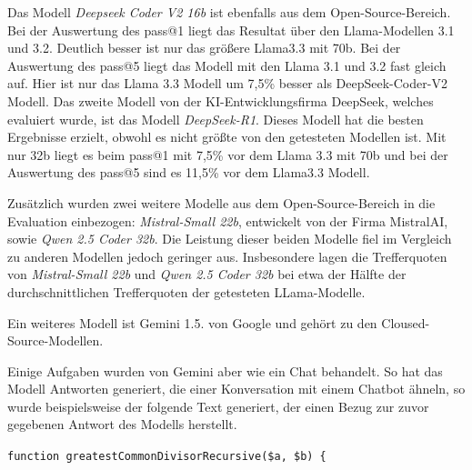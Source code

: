 Das Modell \textit{Deepseek Coder V2 16b} ist ebenfalls aus dem Open-Source-Bereich. Bei der Auswertung des pass@1 liegt das Resultat über den Llama-Modellen 3.1 und 3.2. Deutlich besser ist nur das größere Llama3.3 mit 70b. Bei der Auswertung des pass@5 liegt das Modell mit den Llama 3.1 und 3.2 fast gleich auf. Hier ist nur das Llama 3.3 Modell um 7,5\% besser als DeepSeek-Coder-V2 Modell. Das zweite Modell von der KI-Entwicklungsfirma DeepSeek, welches evaluiert wurde, ist das Modell \textit{DeepSeek-R1}. Dieses Modell hat die besten Ergebnisse erzielt, obwohl es nicht größte von den getesteten Modellen ist. Mit nur 32b liegt es beim pass@1 mit 7,5\% vor dem Llama 3.3 mit 70b und bei der Auswertung des pass@5 sind es 11,5\% vor dem Llama3.3 Modell.\vspace{0.2cm}

Zusätzlich wurden zwei weitere Modelle aus dem Open-Source-Bereich in die Evaluation einbezogen: \textit{Mistral-Small 22b}, entwickelt von der Firma MistralAI, sowie \textit{Qwen 2.5 Coder 32b}. Die Leistung dieser beiden Modelle fiel im Vergleich zu anderen Modellen jedoch geringer aus. Insbesondere lagen die Trefferquoten von \textit{Mistral-Small 22b} und \textit{Qwen 2.5 Coder 32b} bei etwa der Hälfte der durchschnittlichen Trefferquoten der getesteten LLama-Modelle.\vspace{0.2cm}



Ein weiteres Modell ist Gemini 1.5. von Google und gehört zu den Cloused-Source-Modellen. 

Einige Aufgaben wurden von Gemini aber wie ein Chat behandelt. So hat das Modell Antworten generiert, die einer Konversation mit einem Chatbot ähneln, so wurde beispielsweise der folgende Text generiert, der einen Bezug zur zuvor gegebenen Antwort des Modells herstellt.

\hrulefill

\texttt{function greatestCommonDivisorRecursive(\$a, \$b) \{}

